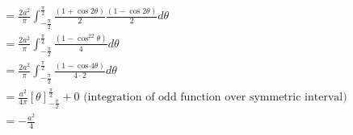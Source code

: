 \begin{enumerate}
\begin{align*}
	\\ &= \frac{2a^2}{\pi}\int_{-\frac{\pi}{2}}^{\frac{\pi}{2}}\frac{(1+\cos2\theta)}{2} \frac{(1-\cos2\theta)}{2}d\theta 
	\\ &= \frac{2a^2}{\pi}\int_{-\frac{\pi}{2}}^{\frac{\pi}{2}}\frac{(1-\cos^22\theta)}{4} d\theta 
	\\ &= \frac{2a^2}{\pi}\int_{-\frac{\pi}{2}}^{\frac{\pi}{2}}\frac{(1-\cos4\theta)}{4\cdot2} d\theta
	\\ &= \frac{a^2}{4\pi}[\theta]_{-\frac{\pi}{2}}^{\frac{\pi}{2}} + 0 \text{ (integration of odd function over symmetric interval)}
	\\ &= -\frac{a^{2}}{4}
	\end{align*}
\end{enumerate}

